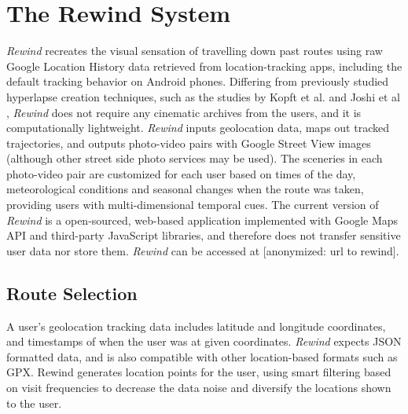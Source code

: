 \documentclass{sigchi}
\begin{document}
\section{The Rewind System}

\textit{Rewind} recreates the visual sensation of travelling down past routes using raw Google Location History data retrieved from location-tracking apps, including the default tracking behavior on Android phones. Differing from previously studied hyperlapse creation techniques, such as the studies by Kopft et al. and Joshi et al \cite{Kopf:2014:FHV:2601097.2601195, Joshi:2015:RHC:2809654.2766954}, \textit{Rewind} does not require any cinematic archives from the users, and it is computationally lightweight. \textit{Rewind} inputs geolocation data, maps out tracked trajectories, and outputs photo-video pairs with Google Street View images (although other street side photo services may be used). The sceneries in each photo-video pair are customized for each user based on times of the day, meteorological conditions and seasonal changes when the route was taken, providing users with multi-dimensional temporal cues. The current version of \textit{Rewind} is a open-sourced, web-based application implemented with Google Maps API and third-party JavaScript libraries, and therefore does not transfer sensitive user data nor store them. \textit{Rewind} can be accessed at [anonymized: url to rewind].  %


\subsection{Route Selection}
A user's geolocation tracking data includes latitude and longitude coordinates, and timestamps of when the user was at given coordinates. \textit{Rewind} expects JSON formatted data, and is also compatible with other location-based formats such as GPX. Rewind generates location points for the user, using smart filtering based on visit frequencies to decrease the data noise and diversify the locations shown to the user.
\end{document}
